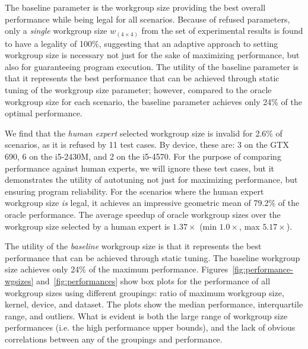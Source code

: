   The baseline parameter is the workgroup size providing the best
  overall performance while being legal for all scenarios. Because of
  refused parameters, only a \emph{single} workgroup size
  $w_{(4 \times 4)}$ from the set of experimental results is found to
  have a legality of 100\%, suggesting that an adaptive approach to
  setting workgroup size is necessary not just for the sake of
  maximizing performance, but also for guaranteeing program
  execution. The utility of the baseline parameter is that it represents
  the best performance that can be achieved through static tuning of the
  workgroup size parameter; however, compared to the oracle workgroup
  size for each scenario, the baseline parameter achieves only 24\% of
  the optimal performance.


  We find that the \emph{human expert} selected workgroup size is
  invalid for 2.6\% of scenarios, as it is refused by 11 test cases. By
  device, these are: 3 on the GTX 690, 6 on the i5-2430M, and 2 on the
  i5-4570. For the purpose of comparing performance against human
  experts, we will ignore these test cases, but it demonstrates the
  utility of autotuning not just for maximizing performance, but
  ensuring program reliability. For the scenarios where the human expert
  workgroup size \emph{is} legal, it achieves an impressive geometric
  mean of 79.2\% of the oracle performance. The average speedup of
  oracle workgroup sizes over the workgroup size selected by a human
  expert is $1.37\times$ (min $1.0\times$, max $5.17\times$).

  The utility of the \emph{baseline} workgroup size is that it
  represents the best performance that can be achieved through static
  tuning. The baseline workgroup size achieves only 24\% of the maximum
  performance. Figures~\ref{fig:performance-wgsizes}
  and~\ref{fig:performances} show box plots for the performance of all
  workgroup sizes using different groupings: ratio of maximum workgroup
  size, kernel, device, and dataset. The plots show the median
  performance, interquartile range, and outliers. What is evident is
  both the large range of workgroup size performances (i.e. the high
  performance upper bounds), and the lack of obvious correlations
  between any of the groupings and performance.

